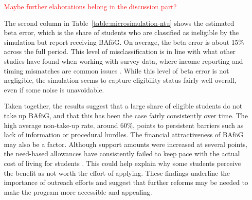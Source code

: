 \textcolor{red}{Maybe further elaborations belong in the discussion part?}

The second column in Table~\ref{table:microsimulation-ntu} shows the estimated beta error, which is the share of students who are classified as ineligible by the simulation but report receiving BAföG. On average, the beta error is about 15\% across the full period. This level of misclassification is in line with what other studies have found when working with survey data, where income reporting and timing mismatches are common issues \citep{frick_claim_2007}. While this level of beta error is not negligible, the simulation seems to capture eligibility status fairly well overall, even if some noise is unavoidable.

Taken together, the results suggest that a large share of eligible students do not take up BAföG, and that this has been the case fairly consistently over time. The high average non-take-up rate, around 60\%, points to persistent barriers such as lack of information or procedural hurdles. The financial attractiveness of BAföG may also be a factor. Although support amounts were increased at several points, the need-based allowances have consistently failed to keep pace with the actual cost of living for students \citep{staack_von_2017}. This could help explain why some students perceive the benefit as not worth the effort of applying. These findings underline the importance of outreach efforts and suggest that further reforms may be needed to make the program more accessible and appealing.


